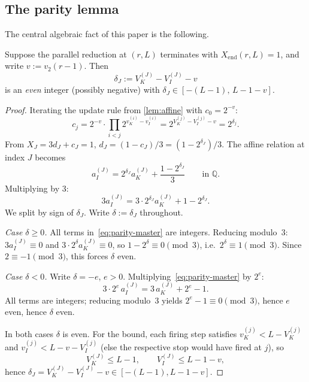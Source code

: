 \documentclass[11pt,reqno]{amsart}
\newcommand{\Q}{\mathbb{Q}}
\newcommand{\Xend}{X_{\mathrm{end}}}
\newcommand{\Vk}{V_{K}}
\newcommand{\Vi}{V_{I}}
\newcommand{\vk}{v_{K}}
\newcommand{\vi}{v_{I}}
\newcommand{\vtwo}{v_{2}}
\begin{document}
\subsection{The parity lemma}

The central algebraic fact of this paper is the following.

\begin{lemma}
\label{lem:parity}
Suppose the parallel reduction at $(r, L)$ terminates with $\Xend(r, L) = 1$,
and write $v := \vtwo(r-1)$. Then
\[
\delta_J := \Vk^{(J)} - \Vi^{(J)} - v
\]
is an \emph{even} integer (possibly negative) with
$\delta_J \in [-(L-1),\, L - 1 - v]$.
\end{lemma}

\begin{proof}
Iterating the update rule from \cref{lem:affine} with $c_0 = 2^{-v}$:
\[
c_j = 2^{-v} \cdot \prod_{i < j} 2^{\vk^{(i)} - \vi^{(i)}} = 2^{\Vk^{(j)} - \Vi^{(j)} - v} = 2^{\delta_j}.
\]
From $X_J = 3 d_J + c_J = 1$, $d_J = (1 - c_J)/3 = (1 - 2^{\delta_J})/3$.
The affine relation at index $J$ becomes
\[
a_I^{(J)} = 2^{\delta_J} a_K^{(J)} + \frac{1 - 2^{\delta_J}}{3} \qquad \text{in } \Q.
\]
Multiplying by $3$:
\begin{equation}\label{eq:parity-master}
3 a_I^{(J)} = 3 \cdot 2^{\delta_J} a_K^{(J)} + 1 - 2^{\delta_J}.
\end{equation}
We split by sign of $\delta_J$. Write $\delta := \delta_J$ throughout.

\emph{Case $\delta \ge 0$.} All terms in~\eqref{eq:parity-master} are integers.
Reducing modulo~$3$: $3 a_I^{(J)} \equiv 0$ and $3 \cdot 2^\delta a_K^{(J)} \equiv 0$,
so $1 - 2^\delta \equiv 0 \pmod 3$, i.e.\ $2^\delta \equiv 1 \pmod 3$. Since
$2 \equiv -1 \pmod 3$, this forces $\delta$ even.

\emph{Case $\delta < 0$.} Write $\delta = -e$, $e > 0$. Multiplying~\eqref{eq:parity-master}
by $2^e$:
\[
3 \cdot 2^e \, a_I^{(J)} = 3 \, a_K^{(J)} + 2^e - 1.
\]
All terms are integers; reducing modulo~$3$ yields $2^e - 1 \equiv 0 \pmod 3$,
hence $e$ even, hence $\delta$ even.

In both cases $\delta$ is even. For the bound, each firing step satisfies
$\vk^{(j)} < L - \Vk^{(j)}$ and $\vi^{(j)} < L - v - \Vi^{(j)}$ (else the
respective stop would have fired at $j$), so
\[
\Vk^{(J)} \le L - 1, \qquad \Vi^{(J)} \le L - 1 - v,
\]
hence $\delta_J = \Vk^{(J)} - \Vi^{(J)} - v \in [-(L-1), L - 1 - v]$.
\qedhere
\end{proof}
\end{document}
